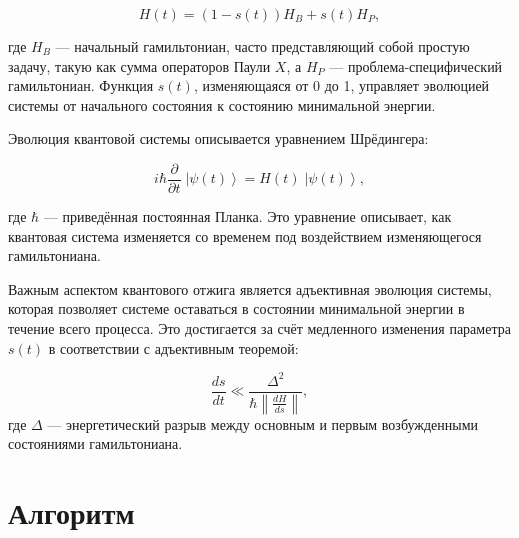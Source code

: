 \documentclass[a4paper]{report}
\newcommand{\ket}[1] {\!\!\;\ensuremath{\left|#1\right\rangle}}
\begin{document}
\begin{equation}
H(t) = (1 - s(t)) H_B + s(t) H_P,
\end{equation}

где $H_B$ — начальный гамильтониан, часто представляющий собой простую задачу, такую как сумма операторов Паули $X$, а $H_P$ — проблема-специфический гамильтониан. Функция $s(t)$, изменяющаяся от 0 до 1, управляет эволюцией системы от начального состояния к состоянию минимальной энергии.

Эволюция квантовой системы описывается уравнением Шрёдингера:

\begin{equation}
i \hbar \frac{\partial}{\partial t} \ket{\psi(t)} = H(t) \ket{\psi(t)},
\end{equation}

где $\hbar$ — приведённая постоянная Планка. Это уравнение описывает, как квантовая система изменяется со временем под воздействием изменяющегося гамильтониана.

Важным аспектом квантового отжига является адъективная эволюция системы, которая позволяет системе оставаться в состоянии минимальной энергии в течение всего процесса. Это достигается за счёт медленного изменения параметра $s(t)$ в соответствии с адъективным теоремой:

\begin{equation}
\frac{ds}{dt} \ll \frac{\Delta^2}{\hbar \left\lVert \frac{dH}{ds} \right\rVert},
\end{equation}
где $\Delta$ — энергетический разрыв между основным и первым возбужденными состояниями гамильтониана.


\section{Алгоритм}
\end{document}
